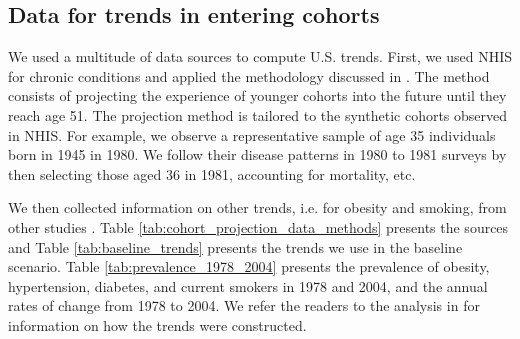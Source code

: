 \subsection{Data for trends in entering cohorts}
\label{sec:data_sources_trends_and_baseline_entering_cohorts}
We used a multitude of data sources to compute U.S. trends. First, we used NHIS for chronic conditions 
and applied the methodology discussed in \citep{goldman2004health}. The method consists of projecting the 
experience of younger cohorts into the future until they reach age 51. The projection method is 
tailored to the synthetic cohorts observed in NHIS. For example, we observe a representative sample of 
age 35 individuals born in 1945 in 1980. We follow their disease patterns in 1980 to 1981 surveys by 
then selecting those aged 36 in 1981, accounting for mortality, etc.  

We then collected information on other trends, i.e. for obesity and smoking, from 
other studies \citep{honeycutt2003dynamic,levy2006smoking,poterba2009decline,ruhm2007current,mainous2007impact}. 
Table \ref{tab:cohort_projection_data_methods} presents the sources and Table \ref{tab:baseline_trends} presents the trends we use in the baseline scenario. 
Table \ref{tab:prevalence_1978_2004} presents the prevalence of obesity, hypertension, diabetes, and current smokers in 1978 and 
2004, and the annual rates of change from 1978 to 2004.  We refer the readers to the analysis in 
\citet{goldman2004health} for information on how the trends were constructed.

